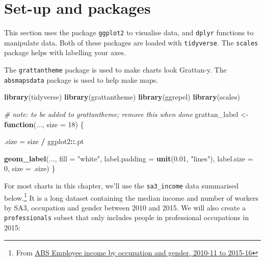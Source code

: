 \documentclass[]{book}
\newenvironment{Shaded}{\begin{snugshade}}{\end{snugshade}}
\newcommand{\CommentTok}[1]{\textcolor[rgb]{0.56,0.35,0.01}{\textit{#1}}}
\newcommand{\ControlFlowTok}[1]{\textcolor[rgb]{0.13,0.29,0.53}{\textbf{#1}}}
\newcommand{\DataTypeTok}[1]{\textcolor[rgb]{0.13,0.29,0.53}{#1}}
\newcommand{\DecValTok}[1]{\textcolor[rgb]{0.00,0.00,0.81}{#1}}
\newcommand{\FloatTok}[1]{\textcolor[rgb]{0.00,0.00,0.81}{#1}}
\newcommand{\KeywordTok}[1]{\textcolor[rgb]{0.13,0.29,0.53}{\textbf{#1}}}
\newcommand{\NormalTok}[1]{#1}
\newcommand{\OperatorTok}[1]{\textcolor[rgb]{0.81,0.36,0.00}{\textbf{#1}}}
\newcommand{\StringTok}[1]{\textcolor[rgb]{0.31,0.60,0.02}{#1}}
\let\rmarkdownfootnote\footnote%
\def\footnote{\protect\rmarkdownfootnote}
\begin{document}
\hypertarget{set-up-and-packages}{%
\section{Set-up and packages}\label{set-up-and-packages}}

This section uses the package \texttt{ggplot2} to visualise data, and \texttt{dplyr} functions to manipulate data. Both of these packages are loaded with \texttt{tidyverse}. The \texttt{scales} package helps with labelling your axes.

The \texttt{grattantheme} package is used to make charts look Grattan-y. The \texttt{absmapsdata} package is used to help make maps.

\begin{Shaded}
\begin{Highlighting}[]
\KeywordTok{library}\NormalTok{(tidyverse)}
\KeywordTok{library}\NormalTok{(grattantheme)}
\KeywordTok{library}\NormalTok{(ggrepel)}
\KeywordTok{library}\NormalTok{(scales)}
\end{Highlighting}
\end{Shaded}

\begin{Shaded}
\begin{Highlighting}[]
\CommentTok{# note: to be added to grattantheme; remove this when done}
\NormalTok{grattan_label <-}\StringTok{ }\ControlFlowTok{function}\NormalTok{(..., }\DataTypeTok{size =} \DecValTok{18}\NormalTok{) \{}

\NormalTok{  .size =}\StringTok{ }\NormalTok{size }\OperatorTok{/}\StringTok{ }\NormalTok{ggplot2}\OperatorTok{::}\NormalTok{.pt}
  
\KeywordTok{geom_label}\NormalTok{(..., }
           \DataTypeTok{fill =} \StringTok{"white"}\NormalTok{,}
           \DataTypeTok{label.padding =} \KeywordTok{unit}\NormalTok{(}\FloatTok{0.01}\NormalTok{, }\StringTok{"lines"}\NormalTok{), }
           \DataTypeTok{label.size =} \DecValTok{0}\NormalTok{,}
           \DataTypeTok{size =}\NormalTok{ .size)}
\NormalTok{\}}
\end{Highlighting}
\end{Shaded}

For most charts in this chapter, we'll use the \texttt{sa3\_income} data summarised below.\footnote{From \href{https://www.abs.gov.au/AUSSTATS/abs@.nsf/DetailsPage/6524.0.55.0022011-2016?OpenDocument}{ABS Employee income by occupation and gender, 2010-11 to 2015-16}} It is a long dataset containing the median income and number of workers by SA3, occupation and gender between 2010 and 2015. We will also create a \texttt{professionals} subset that only includes people in professional occupations in 2015:
\end{document}
